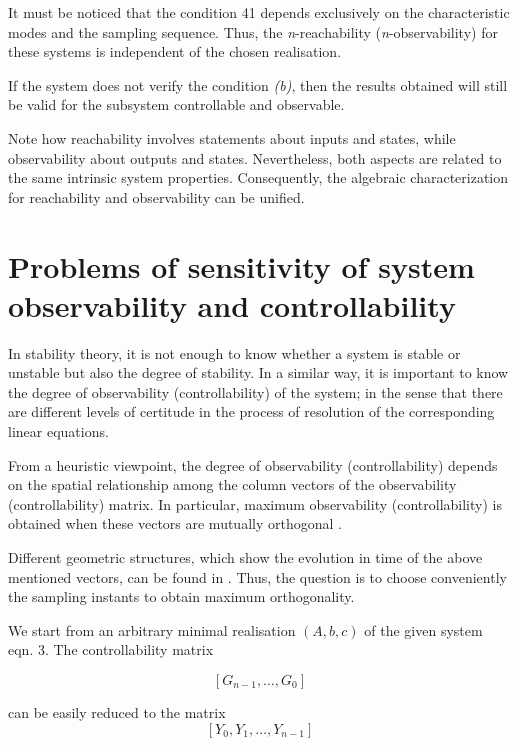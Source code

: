 \documentclass{article}
\begin{document}
It must be noticed that
the condition 41 depends exclusively on the characteristic modes
and the sampling sequence. Thus, the \textit{n}-reachability
(\textit{n}-observability) for these systems is independent of the chosen
realisation.

If the system does not verify the condition \textit{(b)}, then
the results obtained will still be valid for the subsystem
controllable and observable.

Note how reachability involves
statements about inputs and states, while observability about outputs
and states. Nevertheless, both aspects are related to the same
intrinsic system properties. Consequently, the algebraic
characterization for reachability and observability can be
unified.


\section{Problems of sensitivity of system observability and controllability}
In stability theory, it is not enough to know whether a system is
stable or unstable but also the degree of stability. In a similar
way, it is important to know the degree of observability
(controllability) of the system; in the sense that there are
different levels of certitude in the process of resolution of the
corresponding linear equations.

From a heuristic viewpoint, the degree of observability
(controllability) depends on the spatial relationship among the
column vectors of the observability (controllability) matrix. In
particular, maximum observability (controllability) is obtained
when these vectors are mutually orthogonal \cite{Troch}.

Different geometric structures, which show the
evolution in time of the above mentioned vectors, can be found in
\cite{Fuster}. Thus, the question is to choose conveniently the
sampling instants to obtain maximum orthogonality.

We start from
an arbitrary minimal realisation $(A, b, c)$ of the given system
eqn. 3. The controllability matrix

\begin{equation}\label{eq:42}
[G_{n-1}, \ldots , G_0]
\end{equation}

can be easily reduced to the matrix
\begin{equation}\label{eq:43}
[Y_{0},Y_{1}, \ldots , Y_{n-1}]
\end{equation}
\end{document}
